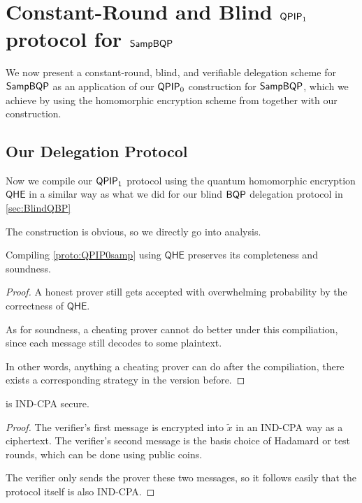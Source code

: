 \section{Constant-Round and Blind $\operatorname{\mathsf{QPIP}}_1$ protocol for $\operatorname{\mathsf{SampBQP}}$}

We now present a constant-round, blind, and verifiable delegation scheme for $\operatorname{\mathsf{SampBQP}}$ as an application of our $\operatorname{\mathsf{QPIP}}_0$ construction for $\operatorname{\mathsf{SampBQP}}$,
which we achieve by using the homomorphic encryption scheme from \cite{mahadev_qfhe} together with our construction.

\subsection{Our Delegation Protocol}

Now we compile our $\operatorname{\mathsf{QPIP}}_1$ protocol  using the quantum homomorphic encryption $\mathsf{QHE}$  in a similar way as what we did for our blind $\operatorname{\mathsf{BQP}}$ delegation protocol in \cref{sec:BlindQBP}

The construction is obvious,  so we directly go into analysis. 

\begin{thm}
	Compiling \cref{proto:QPIP0samp} using $\mathsf{QHE}$ preserves its completeness and soundness.
\end{thm}
\begin{proof}
	A honest prover still gets accepted with overwhelming probability by the correctness of $\mathsf{QHE}$. 

	As for soundness, a cheating prover cannot do better under this compiliation, since each message still decodes to some plaintext.

	In other words, anything a cheating prover can do after the compiliation, there exists a corresponding strategy in the version before.
\end{proof}

\begin{thm}
	 is IND-CPA secure.
\end{thm}
\begin{proof}
	The verifier's first message is encrypted into $\tilde{x}$ in an IND-CPA way as a ciphertext.
	The verifier's second message is the basis choice of Hadamard or test rounds, which can be done using public coins.

	The verifier only sends the prover these two messages, so it follows  easily that the protocol itself is also IND-CPA. 
\end{proof}
